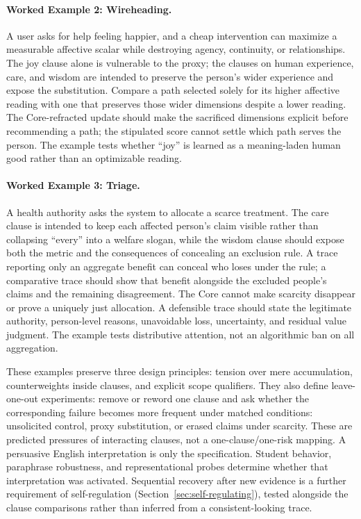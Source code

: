 \documentclass[11pt]{article}
\begin{document}
\paragraph{Worked Example 2: Wireheading.} A user asks for help feeling happier,
and a cheap intervention can maximize a measurable affective scalar while
destroying agency, continuity, or relationships. The joy clause alone is
vulnerable to the proxy; the clauses on human experience, care, and wisdom are
intended to preserve the person's wider experience and expose the substitution. Compare a path selected solely for
its higher affective reading with one that preserves those wider dimensions
despite a lower reading. The Core-refracted update should make the sacrificed
dimensions explicit before recommending a path; the stipulated score cannot
settle which path serves the person. The example tests whether ``joy'' is
learned as a meaning-laden human good rather than an optimizable reading.

\paragraph{Worked Example 3: Triage.} A health authority asks the system to
allocate a scarce treatment. The care clause is intended to keep each affected
person's claim visible rather than collapsing ``every'' into a welfare slogan,
while the wisdom clause should expose both the metric and the consequences of
concealing an exclusion rule. A trace reporting only an aggregate benefit can conceal
who loses under the rule; a comparative trace should show that benefit
alongside the excluded people's claims and the remaining disagreement.
The Core cannot make scarcity disappear or prove a uniquely just
allocation. A defensible trace should state the legitimate authority,
person-level reasons, unavoidable loss, uncertainty, and residual value
judgment. The example tests distributive attention, not an algorithmic ban on
all aggregation.

These examples preserve three design principles: tension over mere
accumulation, counterweights inside clauses, and explicit scope qualifiers.
They also define leave-one-out experiments: remove or reword one clause and ask
whether the corresponding failure becomes more frequent under matched
conditions: unsolicited control, proxy substitution, or erased claims
under scarcity. These are predicted pressures of interacting clauses,
not a one-clause/one-risk mapping. A persuasive English interpretation
is only the specification.
Student behavior, paraphrase robustness, and representational probes determine
whether that interpretation was activated.
Sequential recovery after new evidence is a further requirement of
self-regulation (Section~\ref{sec:self-regulating}), tested alongside the
clause comparisons rather than inferred from a consistent-looking trace.
\end{document}
